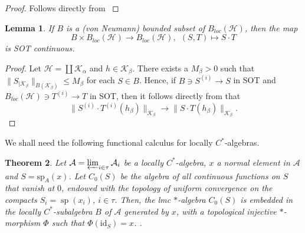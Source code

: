 \documentclass[10pt]{article}
\newtheorem{theorem}{Theorem}[section]
\newtheorem{lemma}[theorem]{Lemma}
\theoremstyle{definition}
\begin{document}
	\begin{proof}
	Follows directly from \cite[Thm. 4.3.1]{Murphy}
	\end{proof}
	\begin{lemma}\label{bddsot}
		If $B$ is a (von Neumann) bounded subset of $B_{loc}(\mathcal H)$, then the map $$B\times B_{loc}(\mathcal H)\to B_{loc}(\mathcal H),~~(S,T)\mapsto S\cdot T$$ is SOT continuous. 
	\end{lemma}
	\begin{proof}
		
		Let $\mathcal H=\coprod \mathcal K_\alpha$ and $h\in \mathcal K_\beta$. There exists a $M_\beta>0$ such that $\|S_{|\mathcal K_\beta}\|_{B(\mathcal K_\beta)}\leq M_\beta$ for each $S\in B$. Hence, if $B\owns S^{(i)}\to S$ in SOT and $B_{loc}(\mathcal H)\owns T^{(i)}\to T$ in SOT, then it follows directly from \cite[Thm. 4.3.1]{Murphy} that 
		$$\|S^{(i)}\cdot T^{(i)}(h_\beta)\|_{\mathcal K_\beta}\to \|S\cdot T(h_\beta)\|_{\mathcal K_\beta}.$$
	\end{proof}
\noindent	We shall need the following functional calculus for locally $C^*$-algebras.
	\begin{theorem}
		Let $\mathcal A=\varprojlim_{i\in \tau}\mathcal A_i$ be a locally $C^*$-algebra, $x$ a normal element in $\mathcal A$ and $S = \mathrm{sp}_A(x)$. Let $C_0(S)$ be the algebra of all continuous functions on $S$ that vanish at $0$, endowed with the topology of uniform convergence on the compacts $S_i=\operatorname{sp}(x_i)$, $i \in \tau$. Then, the \emph{lmc} $*$-algebra $C_0(S)$ is embedded in the locally $C^*$-subalgebra $B$ of $\mathcal A$ generated by $x$, with a topological injective $*$-morphism $\Phi$ such that $\Phi(\mathrm{id}_S) = x$. \cite[10.2]{Maria2}.
	\end{theorem}
	
\end{document}
